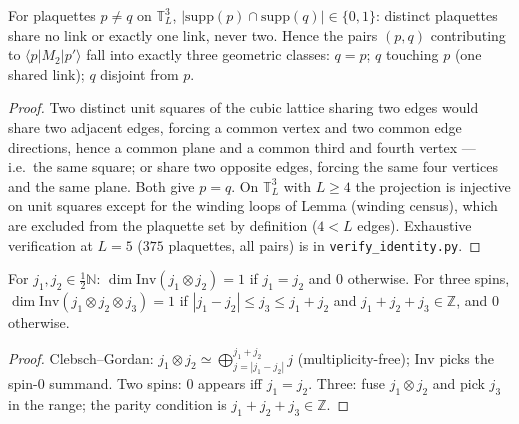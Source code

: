 \begin{lemma}\label{lem:exhaust2}
For plaquettes $p\ne q$ on $\mathbb T_L^3$, $|\mathrm{supp}(p)\cap
\mathrm{supp}(q)|\in\{0,1\}$: distinct plaquettes share no link or exactly
one link, never two. Hence the pairs $(p,q)$ contributing to
$\langle p|M_2|p'\rangle$ fall into exactly three geometric classes:
$q=p$; $q$ touching $p$ (one shared link); $q$ disjoint from $p$.
\end{lemma}
\begin{proof}
Two distinct unit squares of the cubic lattice sharing two edges would
share two adjacent edges, forcing a common vertex and two common edge
directions, hence a common plane and a common third and fourth vertex ---
i.e.\ the same square; or share two opposite edges, forcing the same four
vertices and the same plane. Both give $p=q$. On $\mathbb T_L^3$ with
$L\ge4$ the projection is injective on unit squares except for the winding
loops of Lemma (winding census), which are excluded from the plaquette set
by definition ($4<L$ edges). Exhaustive verification at $L=5$
($375$ plaquettes, all pairs) is in \texttt{verify\_identity.py}.
\end{proof}

\begin{lemma}\label{lem:valence}
For $j_1,j_2\in\tfrac12\mathbb N$: $\dim\mathrm{Inv}(j_1\otimes j_2)=1$ if
$j_1=j_2$ and $0$ otherwise. For three spins,
$\dim\mathrm{Inv}(j_1\otimes j_2\otimes j_3)=1$ if
$|j_1-j_2|\le j_3\le j_1+j_2$ and $j_1+j_2+j_3\in\mathbb Z$, and $0$
otherwise.
\end{lemma}
\begin{proof}
Clebsch--Gordan: $j_1\otimes j_2\simeq\bigoplus_{j=|j_1-j_2|}^{j_1+j_2}j$
(multiplicity-free); $\mathrm{Inv}$ picks the spin-$0$ summand. Two spins:
$0$ appears iff $j_1=j_2$. Three: fuse $j_1\otimes j_2$ and pick $j_3$ in
the range; the parity condition is $j_1+j_2+j_3\in\mathbb Z$.
\end{proof}

